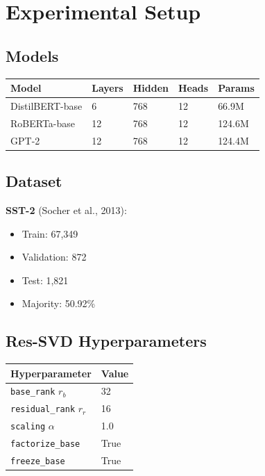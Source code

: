 \section{Experimental Setup}

\subsection{Models}

\begin{table}[H]
\centering
\small
\begin{tabular}{lllll}
\toprule
\textbf{Model} & \textbf{Layers} & \textbf{Hidden} & \textbf{Heads} & \textbf{Params} \\
\midrule
DistilBERT-base & 6 & 768 & 12 & 66.9M \\
RoBERTa-base & 12 & 768 & 12 & 124.6M \\
GPT-2 & 12 & 768 & 12 & 124.4M \\
\bottomrule
\end{tabular}
\end{table}

\subsection{Dataset}

\textbf{SST-2} (Socher et al., 2013):
\begin{itemize}
\item Train: 67,349
\item Validation: 872
\item Test: 1,821
\item Majority: 50.92\%

\end{itemize}
\subsection{Res-SVD Hyperparameters}

\begin{table}[H]
\centering
\small
\begin{tabular}{ll}
\toprule
\textbf{Hyperparameter} & \textbf{Value} \\
\midrule
\texttt{base\_rank} $r_b$ & 32 \\
\texttt{residual\_rank} $r_r$ & 16 \\
\texttt{scaling} $\alpha$ & 1.0 \\
\texttt{factorize\_base} & True \\
\texttt{freeze\_base} & True \\
\bottomrule
\end{tabular}
\end{table}

